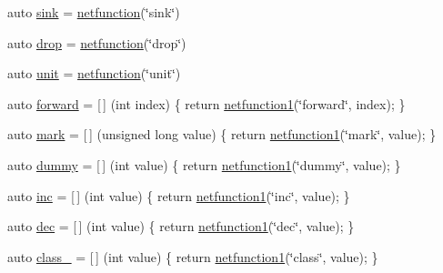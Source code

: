 \begin{DoxyCompactItemize}
\item 
auto \hyperlink{namespacepfq__lang_1_1anonymous__namespace_02default_8hpp_03_ad708862e729d0cc6a217d86bb25b1061}{sink} = \hyperlink{namespacepfq__lang_a9f546a4602872df5ca74050ecb68a6b3}{netfunction}(\char`\"{}sink\char`\"{})
\item 
auto \hyperlink{namespacepfq__lang_1_1anonymous__namespace_02default_8hpp_03_abed0412f2864624f755594077d255b1e}{drop} = \hyperlink{namespacepfq__lang_a9f546a4602872df5ca74050ecb68a6b3}{netfunction}(\char`\"{}drop\char`\"{})
\item 
auto \hyperlink{namespacepfq__lang_1_1anonymous__namespace_02default_8hpp_03_ae78caafebdc64f9180032a049b7c3b3a}{unit} = \hyperlink{namespacepfq__lang_a9f546a4602872df5ca74050ecb68a6b3}{netfunction}(\char`\"{}unit\char`\"{})
\item 
auto \hyperlink{namespacepfq__lang_1_1anonymous__namespace_02default_8hpp_03_a7fbe4b2614dd240727bf1696b4d06523}{forward} = \mbox{[}$\,$\mbox{]} (int index) \{ return \hyperlink{namespacepfq__lang_af215f25fa7ebd61fdc90cf0ef78a3164}{netfunction1}(\char`\"{}forward\char`\"{}, index); \}
\item 
auto \hyperlink{namespacepfq__lang_1_1anonymous__namespace_02default_8hpp_03_ad6142fe3a0fc859f25ea16956f52a5f0}{mark} = \mbox{[}$\,$\mbox{]} (unsigned long value) \{ return \hyperlink{namespacepfq__lang_af215f25fa7ebd61fdc90cf0ef78a3164}{netfunction1}(\char`\"{}mark\char`\"{}, value); \}
\item 
auto \hyperlink{namespacepfq__lang_1_1anonymous__namespace_02default_8hpp_03_a876b4be1c6cf97e317f74242d8fb3da4}{dummy} = \mbox{[}$\,$\mbox{]} (int value) \{ return \hyperlink{namespacepfq__lang_af215f25fa7ebd61fdc90cf0ef78a3164}{netfunction1}(\char`\"{}dummy\char`\"{}, value); \}
\item 
auto \hyperlink{namespacepfq__lang_1_1anonymous__namespace_02default_8hpp_03_a14246183085ec07f08ab9b0d53907ae5}{inc} = \mbox{[}$\,$\mbox{]} (int value) \{ return \hyperlink{namespacepfq__lang_af215f25fa7ebd61fdc90cf0ef78a3164}{netfunction1}(\char`\"{}inc\char`\"{}, value); \}
\item 
auto \hyperlink{namespacepfq__lang_1_1anonymous__namespace_02default_8hpp_03_a6e71e558e459e950a4e9beeaaaf12cf6}{dec} = \mbox{[}$\,$\mbox{]} (int value) \{ return \hyperlink{namespacepfq__lang_af215f25fa7ebd61fdc90cf0ef78a3164}{netfunction1}(\char`\"{}dec\char`\"{}, value); \}
\item 
auto \hyperlink{namespacepfq__lang_1_1anonymous__namespace_02default_8hpp_03_a27a683ef93570a66844e1a0106e6336a}{class\-\_\-} = \mbox{[}$\,$\mbox{]} (int value) \{ return \hyperlink{namespacepfq__lang_af215f25fa7ebd61fdc90cf0ef78a3164}{netfunction1}(\char`\"{}class\char`\"{}, value); \}

\end{DoxyCompactItemize}
